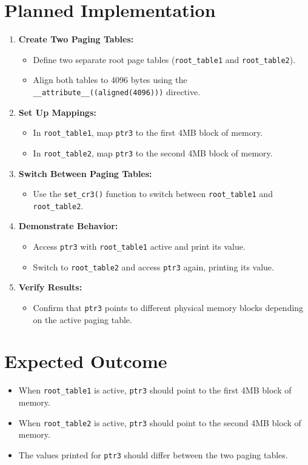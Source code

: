 \documentclass[a4paper,12pt]{report}
\begin{document}
\section{Planned Implementation}
\begin{enumerate}
    \item \textbf{Create Two Paging Tables:}
    \begin{itemize}
        \item Define two separate root page tables (\texttt{root\_table1} and \texttt{root\_table2}).
        \item Align both tables to 4096 bytes using the \texttt{\_\_attribute\_\_((aligned(4096)))} directive.
    \end{itemize}
    \item \textbf{Set Up Mappings:}
    \begin{itemize}
        \item In \texttt{root\_table1}, map \texttt{ptr3} to the first 4MB block of memory.
        \item In \texttt{root\_table2}, map \texttt{ptr3} to the second 4MB block of memory.
    \end{itemize}
    \item \textbf{Switch Between Paging Tables:}
    \begin{itemize}
        \item Use the \texttt{set\_cr3()} function to switch between \texttt{root\_table1} and \texttt{root\_table2}.
    \end{itemize}
    \item \textbf{Demonstrate Behavior:}
    \begin{itemize}
        \item Access \texttt{ptr3} with \texttt{root\_table1} active and print its value.
        \item Switch to \texttt{root\_table2} and access \texttt{ptr3} again, printing its value.
    \end{itemize}
    \item \textbf{Verify Results:}
    \begin{itemize}
        \item Confirm that \texttt{ptr3} points to different physical memory blocks depending on the active paging table.
    \end{itemize}
\end{enumerate}

\section{Expected Outcome}
\begin{itemize}
    \item When \texttt{root\_table1} is active, \texttt{ptr3} should point to the first 4MB block of memory.
    \item When \texttt{root\_table2} is active, \texttt{ptr3} should point to the second 4MB block of memory.
    \item The values printed for \texttt{ptr3} should differ between the two paging tables.
\end{itemize}
\end{document}
